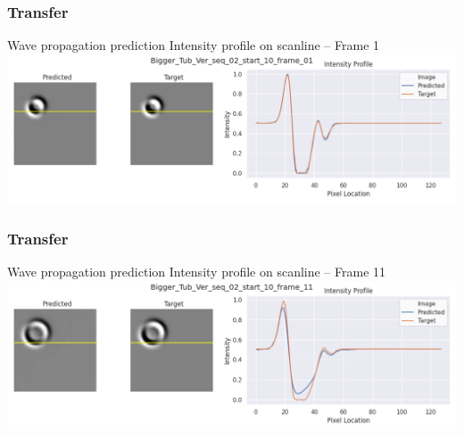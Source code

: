 \begin{frame}
    \frametitle{Transfer}

Wave propagation prediction \newline
Intensity profile on scanline -- Frame 1\\[\baselineskip]

\includegraphics[width=\textwidth, height=.55\textheight]{./Ressourcen/Praesentation/Bilder/WaveTransfer/DFP/Bigger_Tub_Ver_seq_02_start_10_frame_01.png}%

\end{frame}
\clearpage
\begin{frame}
    \frametitle{Transfer}

Wave propagation prediction \newline
Intensity profile on scanline -- Frame 11\\[\baselineskip]

\includegraphics[width=\textwidth, height=.55\textheight]{./Ressourcen/Praesentation/Bilder/WaveTransfer/DFP/Bigger_Tub_Ver_seq_02_start_10_frame_11.png}%

\end{frame}
\clearpage

